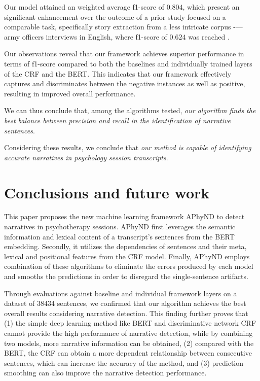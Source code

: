 \documentclass[preprint,12pt]{elsarticle}
\begin{document}
Our model attained an weighted average f1-score of $0.804$, which present an significant enhancement over the outcome of a prior study focused on a comparable task, specifically story extraction from a less intricate corpus -— army officers interviews in English, where f1-score of $0.624$ was reached \cite{gordon2005automated}.

Our observations reveal that our framework achieves superior performance in terms of f1-score compared to both the baselines and individually trained layers of the CRF and the BERT. This indicates that our framework effectively captures and discriminates between the negative instances as well as positive, resulting in improved overall performance.

We can thus conclude that, among the algorithms tested, \emph{our algorithm finds the best balance between precision and recall in the identification of narrative sentences}.

Considering these results, we conclude that \emph{our method is capable of identifying accurate narratives in psychology session transcripts}.

\section{Conclusions and future work}

This paper proposes the new machine learning framework APhyND to detect narratives in psychotherapy sessions. APhyND first leverages the semantic information and lexical content of a transcript's sentences from the BERT embedding.  Secondly, it utilizes the dependencies of sentences and their meta, lexical and positional features from the CRF model. Finally, APhyND employs combination of these algorithms to  eliminate the errors produced by each model and smooths the predictions in order to disregard the single-sentence artifacts. 

Through evaluations against baseline and individual framework layers on a dataset of $38434$ sentences, we confirmed that our algorithm achieves the best overall results considering narrative detection.  This finding further proves that (1) the simple deep learning method like BERT and discriminative network CRF cannot provide the high performance of narrative detection, while by combining two models, more narrative information can be obtained, (2) compared with the BERT, the CRF can obtain a more dependent relationship between consecutive sentences, which can increase the accuracy of the method, and (3) prediction smoothing can also improve the narrative detection performance.
\end{document}
